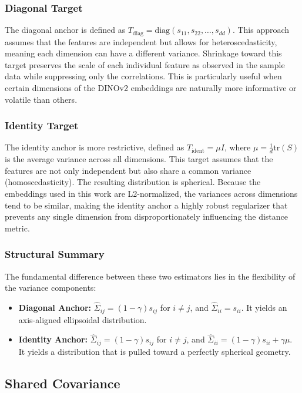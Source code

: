 \subsubsection{Diagonal Target}
The diagonal anchor is defined as $T_{\text{diag}} = \text{diag}(s_{11}, s_{22}, \dots, s_{dd})$. This approach assumes that the features are independent but allows for heteroscedasticity, meaning each dimension can have a different variance. Shrinkage toward this target preserves the scale of each individual feature as observed in the sample data while suppressing only the correlations. This is particularly useful when certain dimensions of the DINOv2 embeddings are naturally more informative or volatile than others.

\subsubsection{Identity Target}The identity anchor is more restrictive, defined as $T_{\text{ident}} = \mu I$, where $\mu = \frac{1}{d} \text{tr}(S)$ is the average variance across all dimensions. This target assumes that the features are not only independent but also share a common variance (homoscedasticity). The resulting distribution is spherical. Because the embeddings used in this work are L2-normalized, the variances across dimensions tend to be similar, making the identity anchor a highly robust regularizer that prevents any single dimension from disproportionately influencing the distance metric.

\subsubsection{Structural Summary}The fundamental difference between these two estimators lies in the flexibility of the variance components:

\begin{itemize}
	\item \textbf{Diagonal Anchor:} $\hat{\Sigma}_{ij} = (1-\gamma)s_{ij}$ for $i \neq j$, and $\hat{\Sigma}_{ii} = s_{ii}$. It yields an axis-aligned ellipsoidal distribution.
	\item \textbf{Identity Anchor:} $\hat{\Sigma}_{ij} = (1-\gamma)s_{ij}$ for $i \neq j$, and $\hat{\Sigma}_{ii} = (1-\gamma)s_{ii} + \gamma \mu$. It yields a distribution that is pulled toward a perfectly spherical geometry.
\end{itemize}

\subsection{Shared Covariance}
\label{subsec:shared_cov_original}


